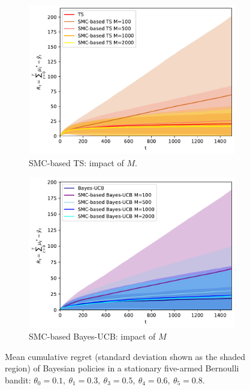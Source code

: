 \begin{figure}[!h]
	\begin{subfigure}[b]{0.46\textwidth}
		\centering
		\includegraphics[width=\textwidth]{./fods_figs/static/bernoulli/A5/theta0.1_0.3_0.5_0.6_0.8_allM_cumulative_regret_ts}
		\caption{SMC-based TS: impact of $M$.}
	\end{subfigure}
	\begin{subfigure}[b]{0.46\textwidth}
		\centering
		\includegraphics[width=\textwidth]{./fods_figs/static/bernoulli/A5/theta0.1_0.3_0.5_0.6_0.8_allM_cumulative_regret_bucb}
		\caption{SMC-based Bayes-UCB: impact of $M$}
	\end{subfigure}
	
	\caption{Mean cumulative regret (standard deviation shown as the shaded region) of Bayesian policies in a stationary five-armed Bernoulli bandit:
		 $\theta_0=0.1, \ \theta_1=0.3, \ \theta_3=0.5, \ \theta_4=0.6, \ \theta_5=0.8$.
	}
\end{figure}

